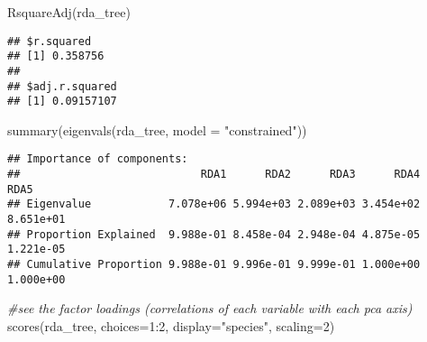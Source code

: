 \documentclass[
]{article}
\newenvironment{Shaded}{\begin{snugshade}}{\end{snugshade}}
\newcommand{\AttributeTok}[1]{\textcolor[rgb]{0.77,0.63,0.00}{#1}}
\newcommand{\CommentTok}[1]{\textcolor[rgb]{0.56,0.35,0.01}{\textit{#1}}}
\newcommand{\DecValTok}[1]{\textcolor[rgb]{0.00,0.00,0.81}{#1}}
\newcommand{\FunctionTok}[1]{\textcolor[rgb]{0.00,0.00,0.00}{#1}}
\newcommand{\NormalTok}[1]{#1}
\newcommand{\SpecialCharTok}[1]{\textcolor[rgb]{0.00,0.00,0.00}{#1}}
\newcommand{\StringTok}[1]{\textcolor[rgb]{0.31,0.60,0.02}{#1}}
\begin{document}
\begin{Shaded}
\begin{Highlighting}[]
\FunctionTok{RsquareAdj}\NormalTok{(rda\_tree)}
\end{Highlighting}
\end{Shaded}

\begin{verbatim}
## $r.squared
## [1] 0.358756
## 
## $adj.r.squared
## [1] 0.09157107
\end{verbatim}

\begin{Shaded}
\begin{Highlighting}[]
\FunctionTok{summary}\NormalTok{(}\FunctionTok{eigenvals}\NormalTok{(rda\_tree, }\AttributeTok{model =} \StringTok{"constrained"}\NormalTok{))}
\end{Highlighting}
\end{Shaded}

\begin{verbatim}
## Importance of components:
##                            RDA1      RDA2      RDA3      RDA4      RDA5
## Eigenvalue            7.078e+06 5.994e+03 2.089e+03 3.454e+02 8.651e+01
## Proportion Explained  9.988e-01 8.458e-04 2.948e-04 4.875e-05 1.221e-05
## Cumulative Proportion 9.988e-01 9.996e-01 9.999e-01 1.000e+00 1.000e+00
\end{verbatim}

\begin{Shaded}
\begin{Highlighting}[]
\CommentTok{\#see the factor loadings (correlations of each variable with each pca axis)}
\FunctionTok{scores}\NormalTok{(rda\_tree, }\AttributeTok{choices=}\DecValTok{1}\SpecialCharTok{:}\DecValTok{2}\NormalTok{, }\AttributeTok{display=}\StringTok{"species"}\NormalTok{, }\AttributeTok{scaling=}\DecValTok{2}\NormalTok{)}
\end{Highlighting}
\end{Shaded}
\end{document}
